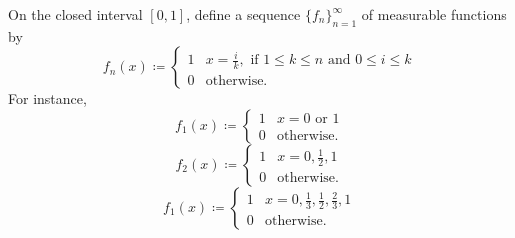 \documentclass{exam}
\begin{document}
\begin{questions}
    \question[14]
        On the closed interval $[0,1]$, define a sequence $\{f_n\}_{n=1}^\infty$ of measurable functions by 
        \begin{equation*}
            f_n(x) \coloneq 
            \begin{cases}
                1 & x=\frac{i}{k}, \text{ if } 1\leq k\leq n \text{ and } 0\leq i\leq k\\
                0 & \text{otherwise.}
            \end{cases}
        \end{equation*}
        For instance,
        \begin{equation*}
            f_1(x) \coloneq
            \begin{cases}
                1 & x=0 \text{ or } 1\\
                0 & \text{otherwise.}
            \end{cases}
        \end{equation*}
        \begin{equation*}
            f_2(x) \coloneq
            \begin{cases}
                1 & x=0, \frac{1}{2}, 1\\
                0 & \text{otherwise.}
            \end{cases}
        \end{equation*}
        \begin{equation*}
            f_1(x) \coloneq
            \begin{cases}
                1 & x=0, \frac{1}{3}, \frac{1}{2}, \frac{2}{3}, 1\\
                0 & \text{otherwise.}
            \end{cases}
        \end{equation*}
        \begin{parts}

\end{parts}
\end{questions}
\end{document}
